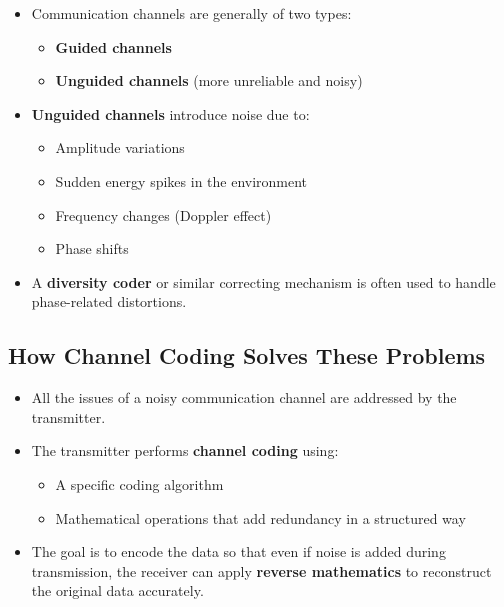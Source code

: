 \documentclass[11pt,a4paper]{book}
\begin{document}
\begin{itemize}[label=$\rightarrow$]
    \item Communication channels are generally of two types:
          \begin{itemize}
              \item \textbf{Guided channels}
              \item \textbf{Unguided channels} (more unreliable and noisy)
          \end{itemize}

    \item \textbf{Unguided channels} introduce noise due to:
          \begin{itemize}
              \item Amplitude variations
              \item Sudden energy spikes in the environment
              \item Frequency changes (Doppler effect)
              \item Phase shifts
          \end{itemize}

    \item A \textbf{diversity coder} or similar correcting mechanism is often used to handle phase-related distortions.
\end{itemize}

\subsection{How Channel Coding Solves These Problems}

\begin{itemize}
    \item All the issues of a noisy communication channel are addressed by the transmitter.
    \item The transmitter performs \textbf{channel coding} using:
          \begin{itemize}
              \item A specific coding algorithm
              \item Mathematical operations that add redundancy in a structured way
          \end{itemize}

    \item The goal is to encode the data so that even if noise is added during transmission, the receiver can apply \textbf{reverse mathematics} to reconstruct the original data accurately.
\end{itemize}
\end{document}
